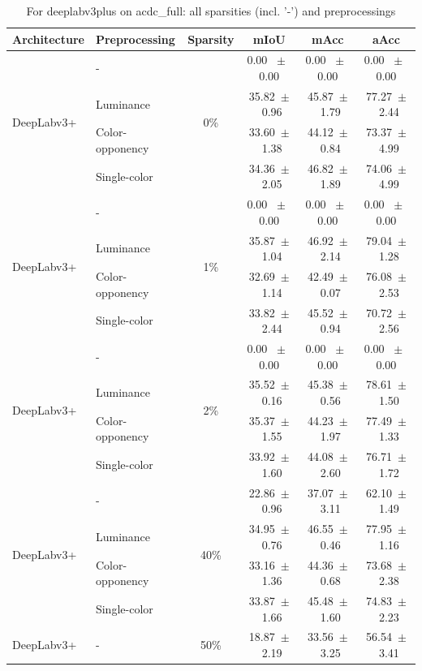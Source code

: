 \begin{table}[h]
  \centering
  \caption{For deeplabv3plus on acdc_full: all sparsities (incl. '-') and preprocessings}
  \begin{tabular}{@{}l l c c c c@{}}
    \toprule
    Architecture & Preprocessing & Sparsity & mIoU & mAcc & aAcc \\
    \midrule
    \multirow{4}{*}{DeepLabv3+} & - & \multirow{4}{*}{0\%} & 0.00 ~$\pm$~ 0.00 & 0.00 ~$\pm$~ 0.00 & 0.00 ~$\pm$~ 0.00 \\
    & Luminance &  & 35.82~$\pm$~0.96 & 45.87~$\pm$~1.79 & 77.27~$\pm$~2.44 \\
    & Color-opponency &  & 33.60~$\pm$~1.38 & 44.12~$\pm$~0.84 & 73.37~$\pm$~4.99 \\
    & Single-color &  & 34.36~$\pm$~2.05 & 46.82~$\pm$~1.89 & 74.06~$\pm$~4.99 \\
    \midrule
    \multirow{4}{*}{DeepLabv3+} & - & \multirow{4}{*}{1\%} & 0.00 ~$\pm$~ 0.00 & 0.00 ~$\pm$~ 0.00 & 0.00 ~$\pm$~ 0.00 \\
    & Luminance &  & 35.87~$\pm$~1.04 & 46.92~$\pm$~2.14 & 79.04~$\pm$~1.28 \\
    & Color-opponency &  & 32.69~$\pm$~1.14 & 42.49~$\pm$~0.07 & 76.08~$\pm$~2.53 \\
    & Single-color &  & 33.82~$\pm$~2.44 & 45.52~$\pm$~0.94 & 70.72~$\pm$~2.56 \\
    \midrule
    \multirow{4}{*}{DeepLabv3+} & - & \multirow{4}{*}{2\%} & 0.00 ~$\pm$~ 0.00 & 0.00 ~$\pm$~ 0.00 & 0.00 ~$\pm$~ 0.00 \\
    & Luminance &  & 35.52~$\pm$~0.16 & 45.38~$\pm$~0.56 & 78.61~$\pm$~1.50 \\
    & Color-opponency &  & 35.37~$\pm$~1.55 & 44.23~$\pm$~1.97 & 77.49~$\pm$~1.33 \\
    & Single-color &  & 33.92~$\pm$~1.60 & 44.08~$\pm$~2.60 & 76.71~$\pm$~1.72 \\
    \midrule
    \multirow{4}{*}{DeepLabv3+} & - & \multirow{4}{*}{40\%} & 22.86~$\pm$~0.96 & 37.07~$\pm$~3.11 & 62.10~$\pm$~1.49 \\
    & Luminance &  & 34.95~$\pm$~0.76 & 46.55~$\pm$~0.46 & 77.95~$\pm$~1.16 \\
    & Color-opponency &  & 33.16~$\pm$~1.36 & 44.36~$\pm$~0.68 & 73.68~$\pm$~2.38 \\
    & Single-color &  & 33.87~$\pm$~1.66 & 45.48~$\pm$~1.60 & 74.83~$\pm$~2.23 \\
    \midrule
    \multirow{4}{*}{DeepLabv3+} & - & \multirow{4}{*}{50\%} & 18.87~$\pm$~2.19 & 33.56~$\pm$~3.25 & 56.54~$\pm$~3.41 \\

\end{tabular}
\end{table}
